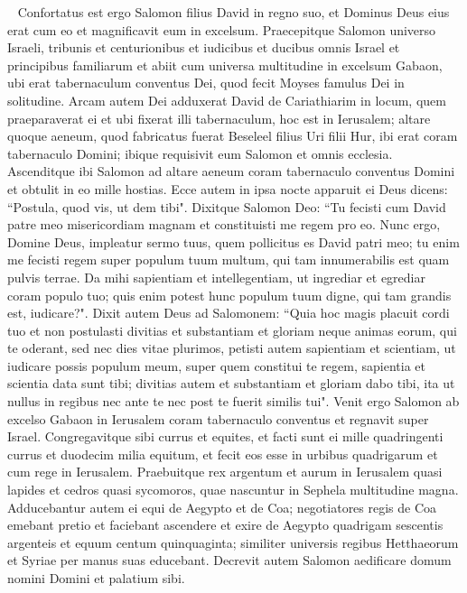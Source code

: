 
\begin{biblechapter}   
\verse Confortatus est ergo Salomon filius David in regno suo, et Dominus Deus eius erat cum eo et magnificavit eum in excelsum.  
\verse Praecepitque Salomon universo Israeli, tribunis et centurionibus et iudicibus et ducibus omnis Israel et principibus familiarum 
\verse et abiit cum universa multitudine in excelsum Gabaon, ubi erat tabernaculum conventus Dei, quod fecit Moyses famulus Dei in solitudine. 
\verse Arcam autem Dei adduxerat David de Cariathiarim in locum, quem praeparaverat ei et ubi fixerat illi tabernaculum, hoc est in Ierusalem; 
\verse altare quoque aeneum, quod fabricatus fuerat Beseleel filius Uri filii Hur, ibi erat coram tabernaculo Domini; ibique requisivit eum Salomon et omnis ecclesia. 
\verse Ascenditque ibi Salomon ad altare aeneum coram tabernaculo conventus Domini et obtulit in eo mille hostias. 
\verse Ecce autem in ipsa nocte apparuit ei Deus dicens: “Postula, quod vis, ut dem tibi". 
\verse Dixitque Salomon Deo: “Tu fecisti cum David patre meo misericordiam magnam et constituisti me regem pro eo. 
\verse Nunc ergo, Domine Deus, impleatur sermo tuus, quem pollicitus es David patri meo; tu enim me fecisti regem super populum tuum multum, qui tam innumerabilis est quam pulvis terrae. 
\verse Da mihi sapientiam et intellegentiam, ut ingrediar et egrediar coram populo tuo; quis enim potest hunc populum tuum digne, qui tam grandis est, iudicare?". 
\verse Dixit autem Deus ad Salomonem: “Quia hoc magis placuit cordi tuo et non postulasti divitias et substantiam et gloriam neque animas eorum, qui te oderant, sed nec dies vitae plurimos, petisti autem sapientiam et scientiam, ut iudicare possis populum meum, super quem constitui te regem,  
\verse sapientia et scientia data sunt tibi; divitias autem et substantiam et gloriam dabo tibi, ita ut nullus in regibus nec ante te nec post te fuerit similis tui". 
\verse Venit ergo Salomon ab excelso Gabaon in Ierusalem coram tabernaculo conventus et regnavit super Israel. 
\verse Congregavitque sibi currus et equites, et facti sunt ei mille quadringenti currus et duodecim milia equitum, et fecit eos esse in urbibus quadrigarum et cum rege in Ierusalem. 
\verse Praebuitque rex argentum et aurum in Ierusalem quasi lapides et cedros quasi sycomoros, quae nascuntur in Sephela multitudine magna. 
\verse Adducebantur autem ei equi de Aegypto et de Coa; negotiatores regis de Coa emebant pretio 
\verse et faciebant ascendere et exire de Aegypto quadrigam sescentis argenteis et equum centum quinquaginta; similiter universis regibus Hetthaeorum et Syriae per manus suas educebant. 
\verse Decrevit autem Salomon aedificare domum nomini Domini et palatium sibi. 
\end{biblechapter}

